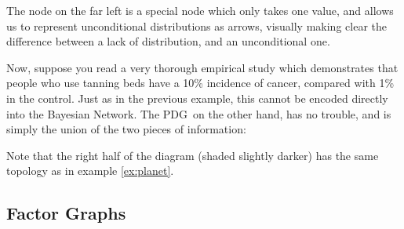 \documentclass{article}
\newcommand{\MN}{PDG}
\begin{document}
\begin{example}
		


		The node on the far left is a special node which only takes one value, and allows us to represent unconditional distributions as arrows, visually making clear the difference between a lack of distribution, and an unconditional one. 
		
		Now, suppose you read a very thorough empirical study which demonstrates that people who use tanning beds have a 10\% incidence of cancer, compared with 1\% in the control. Just as in the previous example, this cannot be encoded directly into the Bayesian Network. 
		The \MN\, on the other hand, has no trouble, and is simply the union of the two pieces of information:
		
		\begin{center}
		\end{center}
		Note that the right half of the diagram (shaded slightly darker) has the same topology as in example \ref{ex:planet}.
	\end{example}


	\subsection{Factor Graphs}
	
\end{document}
